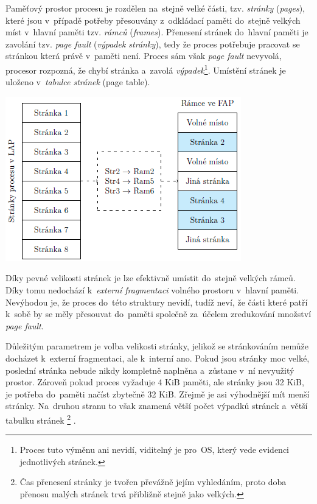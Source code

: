 Paměťový prostor procesu je rozdělen na~stejně velké části, tzv. \emph{stránky} (\emph{pages}), které jsou v~případě potřeby přesouvány z~odkládací paměti do~stejně velkých míst v~hlavní paměti tzv. \emph{rámců} (\emph{frames}). Přenesení stránek do~hlavní paměti je zavolání tzv. \emph{page fault} (\emph{výpadek stránky}), tedy že proces potřebuje pracovat se stránkou která právě v~paměti není. Proces sám však \emph{page fault} nevyvolá, procesor rozpozná, že chybí stránka a~zavolá \emph{výpadek}\footnote{Proces tuto výměnu ani nevidí, viditelný je pro~OS, který vede evidenci jednotlivých stránek.}. Umístění stránek je uloženo v~\emph{tabulce stránek} (page table).

\begin{center}
	\includegraphics[scale=1]{images/mem_page_table.png}
\end{center}

Díky pevné velikosti stránek je lze efektivně umístit do~stejně velkých rámců. Díky tomu nedochází k~\emph{externí fragmentaci} volného prostoru v~hlavní paměti. Nevýhodou je, že proces do~této struktury nevidí, tudíž neví, že části které patří k~sobě by se měly přesouvat do~paměti společně za~účelem zredukování množství \emph{page fault}.

Důležitým parametrem je volba velikosti stránky, jelikož se stránkováním nemůže docházet k~externí fragmentaci, ale k~interní ano. Pokud jsou stránky moc velké, poslední stránka nebude nikdy kompletně naplněna a~zůstane v~ní nevyužitý prostor. Zároveň pokud proces vyžaduje 4 KiB paměti, ale stránky jsou 32 KiB, je potřeba do~paměti načíst zbytečně 32 KiB. Zřejmě je asi výhodnější mít menší stránky. Na~druhou stranu to však znamená větší počet výpadků stránek a~větší tabulku stránek%
\footnote{Čas přenesení stránky je tvořen převážně jejím vyhledáním, proto doba přenosu malých stránek trvá přibližně stejně jako velkých.}%
.

